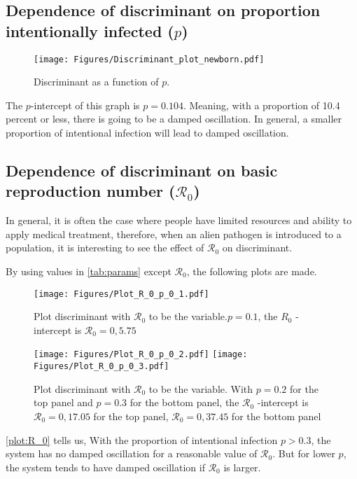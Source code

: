 \documentclass[12pt]{article}
\newcommand{\R}{\mathcal{R}}
\begin{document}
\subsection{Dependence of discriminant on proportion intentionally infected ($p$)}
\begin{figure}[H]
  \caption{Discriminant as a function of $p$.}
  \centering
  \texttt{[image: Figures/Discriminant\_plot\_newborn.pdf]}
\end{figure}

The $p$-intercept of this graph is $p=0.104$. Meaning, with a proportion of 10.4 percent or less, there is going to be a damped oscillation. In general, a smaller  proportion of intentional infection will lead to damped oscillation.



\subsection{Dependence of discriminant on basic reproduction number ($\R_0$)}

In general, it is often the case where people have limited resources and ability to apply medical treatment, therefore, when an alien pathogen is introduced to a population, it is interesting to see the effect of $\R_0$ on discriminant.

By using values in \autoref{tab:params} except $\R_0$, the following plots are made.

\begin{figure}[H] 
  \caption{Plot discriminant with $\R_0$ to be the variable.$p=0.1$, the $R_0$ -intercept is $\R_0 = 0, 5.75$}
  \centering
  \texttt{[image: Figures/Plot\_R\_0\_p\_0\_1.pdf]}
\end{figure}

\begin{figure}[H] \label{plot:R_0}
  \caption{Plot discriminant with $\R_0$ to be the variable. With $p=0.2$ for the top panel and $p=0.3$ for the bottom panel, the $\R_0$ -intercept is $\R_0 = 0, 17.05$ for the top panel, $\mathcal{R}_0 = 0, 37.45$ for the bottom panel}
  \centering
  \texttt{[image: Figures/Plot\_R\_0\_p\_0\_2.pdf]}
  \centering
  \texttt{[image: Figures/Plot\_R\_0\_p\_0\_3.pdf]}
\end{figure}

\autoref{plot:R_0} tells us, With the proportion of intentional infection $p>0.3$, the system has no damped oscillation for a reasonable value of $\R_0$. But for lower $p$, the system tends to have damped oscillation if $\R_0$ is larger.
\end{document}
